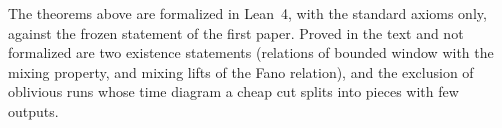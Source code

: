 The theorems above are formalized in Lean~4, with the standard axioms only, against the frozen statement of the first
paper. Proved in the text and not formalized are two existence statements (relations of bounded window with the mixing
property, and mixing lifts of the Fano relation), and the exclusion of
oblivious runs whose time diagram a cheap cut splits into pieces with few outputs.
